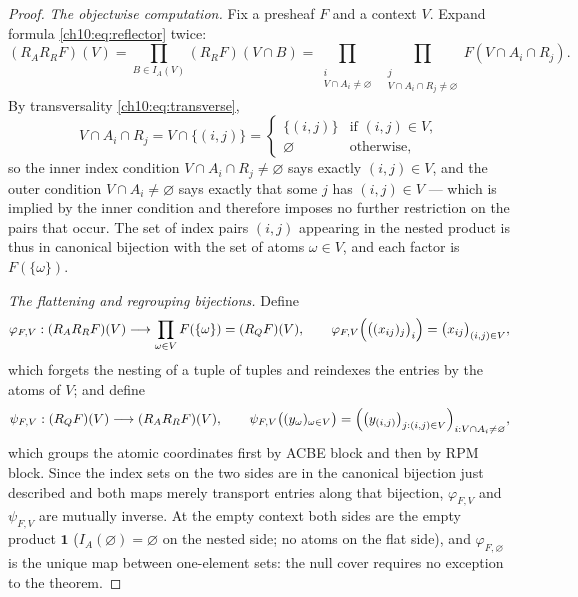\begin{proof}
\emph{The objectwise computation.} Fix a presheaf $F$ and a context $V$.
Expand formula \eqref{ch10:eq:reflector} twice:
\[
(R_A R_R F)(V)
= \prod_{B \in I_A(V)} (R_R F)(V \cap B)
= \prod_{\substack{i \\ V \cap A_i \neq \varnothing}}
  \;\prod_{\substack{j \\ V \cap A_i \cap R_j \neq \varnothing}}
  F(V \cap A_i \cap R_j).
\]
By transversality \eqref{ch10:eq:transverse},
\[
V \cap A_i \cap R_j = V \cap \{(i, j)\}
= \begin{cases} \{(i, j)\} & \text{if } (i, j) \in V, \\
\varnothing & \text{otherwise,} \end{cases}
\]
so the inner index condition $V \cap A_i \cap R_j \neq \varnothing$ says
exactly $(i, j) \in V$, and the outer condition
$V \cap A_i \neq \varnothing$ says exactly that some $j$ has
$(i, j) \in V$ --- which is implied by the inner condition and therefore
imposes no further restriction on the pairs that occur. The set of index
pairs $(i, j)$ appearing in the nested product is thus in canonical bijection
with the set of atoms $\omega \in V$, and each factor is $F(\{\omega\})$.

\emph{The flattening and regrouping bijections.} Define
\[
\varphi_{F, V} : (R_A R_R F)(V) \longrightarrow
\prod_{\omega \in V} F(\{\omega\}) = (R_Q F)(V),
\qquad
\varphi_{F, V}\Bigl( \bigl( (x_{i j})_j \bigr)_i \Bigr)
= \bigl( x_{i j} \bigr)_{(i, j) \in V},
\]
which forgets the nesting of a tuple of tuples and reindexes the entries by
the atoms of $V$; and define
\[
\psi_{F, V} : (R_Q F)(V) \longrightarrow (R_A R_R F)(V),
\qquad
\psi_{F, V}\bigl( (y_\omega)_{\omega \in V} \bigr)
= \Bigl( \bigl( y_{(i, j)} \bigr)_{j : (i, j) \in V}
  \Bigr)_{i : V \cap A_i \neq \varnothing},
\]
which groups the atomic coordinates first by ACBE block and then by RPM
block. Since the index sets on the two sides are in the canonical bijection
just described and both maps merely transport entries along that bijection,
$\varphi_{F, V}$ and $\psi_{F, V}$ are mutually inverse. At the empty context
both sides are the empty product $\mathbf{1}$ ($I_A(\varnothing) =
\varnothing$ on the nested side; no atoms on the flat side), and
$\varphi_{F, \varnothing}$ is the unique map between one-element sets: the
null cover requires no exception to the theorem.


\end{proof}
